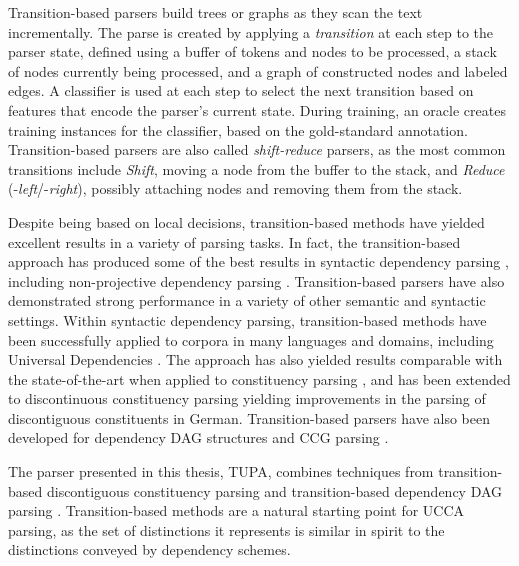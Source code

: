 \documentclass[12pt,a4paper,table]{report}
\renewcommand\cite{\citep}      %
\begin{document}
Transition-based parsers \citep{Nivre03anefficient,nivre2008algorithms} build trees or graphs
as they scan the text incrementally.
The parse is created by applying a \textit{transition} at each step to the parser state,
defined using a buffer of tokens and nodes to be processed,
a stack of nodes currently being processed,
and a graph of constructed nodes and labeled edges.
A classifier is used at each step to select the next transition based on features
that encode the parser's current state.
During training, an oracle creates training instances for the classifier,
based on the gold-standard annotation.
Transition-based parsers are also called \textit{shift-reduce} parsers, as
the most common transitions include \textit{Shift}, moving a node from the buffer
to the stack, and \textit{Reduce} (-\textit{left}/-\textit{right}), possibly attaching nodes and removing them from
the stack.

Despite being based on local decisions, transition-based methods have yielded excellent
results in a variety of parsing tasks.
In fact, the transition-based approach has produced some of the best
results in syntactic dependency parsing
\citep{dyer2015transition,ballesteros2015improved,kiperwasser2016simple,andor2016globally}, 
including non-projective dependency parsing \cite{nivre2009non,kuhlmann2010transition,bohnet2012transition}.
Transition-based parsers have also demonstrated
strong performance in a variety of other semantic and syntactic settings.
Within syntactic dependency parsing, transition-based methods
have been successfully applied to corpora in many languages and domains,
including Universal Dependencies \cite{udpipe,udpipe:2017,de2017old}. 
The approach has also yielded results comparable with the state-of-the-art when applied
to constituency parsing \cite{sagae2005classifier,zhang2009transition,zhu2013fast}, and has been extended to
discontinuous constituency parsing \cite{maier2015discontinuous,maier-lichte:2016:DiscoNLP}
yielding improvements in the parsing of discontiguous constituents in German.
Transition-based parsers have also been developed for dependency DAG structures
\cite{sagae2008shift,tokgoz2015transition} and CCG parsing \cite{ambati2015incremental}.

The parser presented in this thesis, TUPA, combines techniques from transition-based discontiguous constituency parsing \cite{maier2015discontinuous}
and transition-based dependency DAG parsing \cite{tokgoz2015transition}.
Transition-based methods are a natural starting point for UCCA parsing,
as the set of distinctions it represents is similar in spirit to the distinctions
conveyed by dependency schemes.
\end{document}
